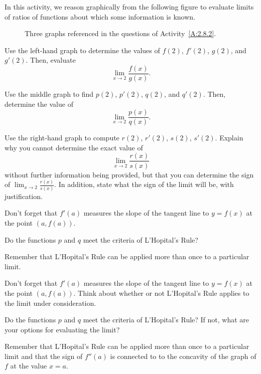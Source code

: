 \begin{activity} \label{A:2.8.2}  
In this activity, we reason graphically from the following figure to evaluate limits of ratios of functions about which some information is known.
\begin{figure}[h]
\begin{center}
\caption{Three graphs referenced in the questions of Activity~\ref{A:2.8.2}.} \label{F:2.8.Act2}
\end{center}
\end{figure}
\ba
	\item Use the left-hand graph to determine the values of $f(2)$, $f'(2)$, $g(2)$, and $g'(2)$.  Then, evaluate 
	$$\lim_{x \to 2} \frac{f(x)}{g(x)}.$$
	\item Use the middle graph to find $p(2)$, $p'(2)$, $q(2)$, and $q'(2)$.  Then, determine the value of
	$$\lim_{x \to 2} \frac{p(x)}{q(x)}.$$
	\item Use the right-hand graph to compute $r(2)$, $r'(2)$, $s(2)$, $s'(2)$.  Explain why you cannot determine the exact value of 
	$$\lim_{x \to 2} \frac{r(x)}{s(x)}$$
	without further information being provided, but that you can determine the sign of $\lim_{x \to 2} \frac{r(x)}{s(x)}$.  In addition, state what the sign of the limit will be, with justification.
\ea
\end{activity}
\begin{smallhint}
\ba
	\item Don't forget that $f'(a)$ measures the slope of the tangent line to $y = f(x)$ at the point $(a,f(a))$.
	\item Do the functions $p$ and $q$ meet the criteria of L'Hopital's Rule?
	\item Remember that L'Hopital's Rule can be applied more than once to a particular limit.
\ea
\end{smallhint}
\begin{bighint}
\ba
	\item Don't forget that $f'(a)$ measures the slope of the tangent line to $y = f(x)$ at the point $(a,f(a))$.  Think about whether or not L'Hopital's Rule applies to the limit under consideration.
	\item Do the functions $p$ and $q$ meet the criteria of L'Hopital's Rule?  If not, what are your options for evaluating the limit?
	\item Remember that L'Hopital's Rule can be applied more than once to a particular limit and that the sign of $f''(a)$ is connected to to the concavity of the graph of $f$ at the value $x = a$.
\ea
\end{bighint}
